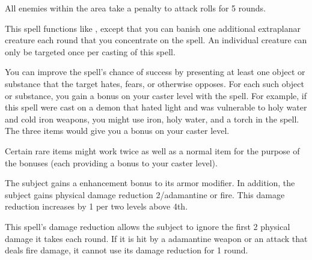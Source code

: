\begin{spelleffect}
  All enemies within the area take a  penalty to attack rolls for 5 rounds.
\end{spelleffect}

\spellrng{\rngmed}
\begin{spelleffect}
  This spell functions like , except that you can banish one additional extraplanar creature each round that you concentrate on the spell. An individual creature can only be targeted once per casting of this spell.
\end{spelleffect}
\begin{spellnotes}
  You can improve the spell's chance of success by presenting at least one object or substance that the target hates, fears, or otherwise opposes. For each such object or substance, you gain a  bonus on your caster level with the spell. For example, if this spell were cast on a demon that hated light and was vulnerable to holy water and cold iron weapons, you might use iron, holy water, and a torch in the spell. The three items would give you a  bonus on your caster level. 
  \par Certain rare items might work twice as well as a normal item for the purpose of the bonuses (each providing a  bonus to your caster level).
\end{spellnotes}

\spelldur{\durshort}
\begin{spelleffect}
  The subject gains a  enhancement bonus to its armor modifier. \bonusscalingdescription In addition, the subject gains physical damage reduction 2/adamantine or fire. This damage reduction increases by 1 per two levels above 4th.
\end{spelleffect}
\begin{spellnotes}
  This spell's damage reduction allows the subject to ignore the first 2 physical damage it takes each round. If it is hit by a adamantine weapon or an attack that deals fire damage, it cannot use its damage reduction for 1 round.
\end{spellnotes}

